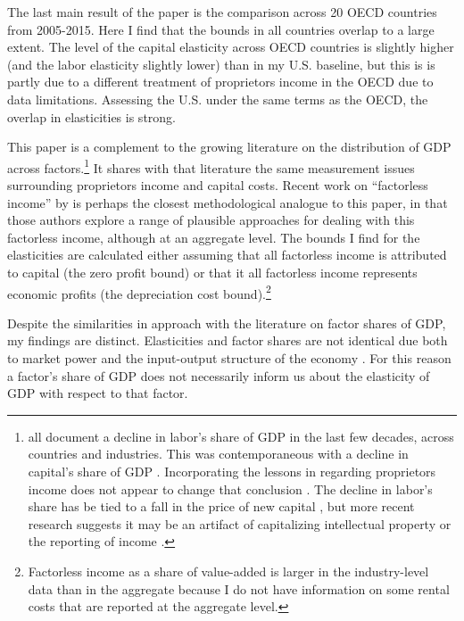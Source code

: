 \documentclass[11pt]{article}
\begin{document}
The last main result of the paper is the comparison across 20 OECD countries from 2005-2015. Here I find that the bounds in all countries overlap to a large extent. The level of the capital elasticity across OECD countries is slightly higher (and the labor elasticity slightly lower) than in my U.S. baseline, but this is is partly due to a different treatment of proprietors income in the OECD due to data limitations. Assessing the U.S. under the same terms as the OECD, the overlap in elasticities is strong. 

This paper is a complement to the growing literature on the distribution of GDP across factors.\footnote{\cite{azmat2012,bentolilaSP2003,estrada2014,harrison2005,jt2007,guscina2006,kn2014,daoetal2017} all document a decline in labor's share of GDP in the last few decades, across countries and industries. This was contemporaneous with a decline in capital's share of GDP \citep{Barkai000,rognlie2015}. Incorporating the lessons in \cite{Gollin:2002zr} regarding proprietors income does not appear to change that conclusion \citep{gommerupert2004,elsbyhs2013}. The decline in labor's share has be tied to a fall in the price of new capital \citep{kn2014}, but more recent research suggests it may be an artifact of capitalizing intellectual property \citep{ksz2020} or the reporting of income \citep{RePEc:oup:qjecon:v:134:y:2019:i:4:p:1675-1745.}.} It shares with that literature the same measurement issues surrounding proprietors income and capital costs. Recent work on ``factorless income'' by \cite{kn2019} is perhaps the closest methodological analogue to this paper, in that those authors explore a range of plausible approaches for dealing with this factorless income, although at an aggregate level. The bounds I find for the elasticities are calculated either assuming that all factorless income is attributed to capital (the zero profit bound) or that it all factorless income represents economic profits (the depreciation cost bound).\footnote{Factorless income as a share of value-added is larger in the industry-level data than in the aggregate because I do not have information on some rental costs that are reported at the aggregate level.} 

Despite the similarities in approach with the literature on factor shares of GDP, my findings are distinct. Elasticities and factor shares are not identical due both to market power and the input-output structure of the economy \citep{bfshortnote,bfprodge}. For this reason a factor's share of GDP does not necessarily inform us about the elasticity of GDP with respect to that factor.
\end{document}
